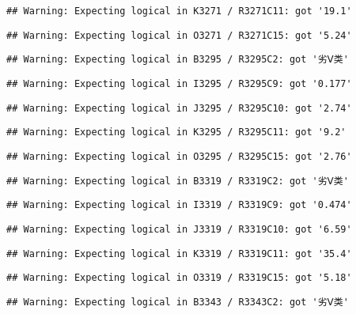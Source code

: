 \documentclass[
]{article}
\begin{document}
\begin{verbatim}
## Warning: Expecting logical in K3271 / R3271C11: got '19.1'
\end{verbatim}

\begin{verbatim}
## Warning: Expecting logical in O3271 / R3271C15: got '5.24'
\end{verbatim}

\begin{verbatim}
## Warning: Expecting logical in B3295 / R3295C2: got '劣Ⅴ类'
\end{verbatim}

\begin{verbatim}
## Warning: Expecting logical in I3295 / R3295C9: got '0.177'
\end{verbatim}

\begin{verbatim}
## Warning: Expecting logical in J3295 / R3295C10: got '2.74'
\end{verbatim}

\begin{verbatim}
## Warning: Expecting logical in K3295 / R3295C11: got '9.2'
\end{verbatim}

\begin{verbatim}
## Warning: Expecting logical in O3295 / R3295C15: got '2.76'
\end{verbatim}

\begin{verbatim}
## Warning: Expecting logical in B3319 / R3319C2: got '劣Ⅴ类'
\end{verbatim}

\begin{verbatim}
## Warning: Expecting logical in I3319 / R3319C9: got '0.474'
\end{verbatim}

\begin{verbatim}
## Warning: Expecting logical in J3319 / R3319C10: got '6.59'
\end{verbatim}

\begin{verbatim}
## Warning: Expecting logical in K3319 / R3319C11: got '35.4'
\end{verbatim}

\begin{verbatim}
## Warning: Expecting logical in O3319 / R3319C15: got '5.18'
\end{verbatim}

\begin{verbatim}
## Warning: Expecting logical in B3343 / R3343C2: got '劣Ⅴ类'
\end{verbatim}
\end{document}
